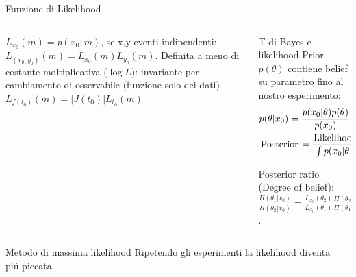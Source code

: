 \documentclass[asd-beamer.tex]{subfiles}
\begin{document}
\begin{frame}{Funzione di Likelihood}
\begin{columns}[T]
	\begin{column}{0.5\textwidth}
		$L_{x_0}(m)=p(x_0;m)$, se x,y eventi indipendenti: $L_{(x_0,y_0)}(m)=L_{x_0}(m)L_{y_0}(m)$. Definita a meno di costante moltiplicativa ($\log{L}$): invariante per cambiamento di osservabile (funzione solo dei dati)
		$L_{f(t_0)}(m)=|J(t_0)|L_{t_0}(m)$
	\end{column}
	\begin{column}{0.5\textwidth}
		\begin{block}{T di Bayes e likelihood}
			Prior $p(\theta)$ contiene belief su parametro fino al nostro esperimento:
			\begin{align*}
			&p(\theta|x_0)=\frac{p(x_0|\theta)p(\theta)}{p(x_0)}\\
			&\operatorname{Posterior}{}=\frac{\operatorname{Likelihood}{}\operatorname{Prior}{}}{\int p(x_0|\theta)p(\theta)\,d\theta}
			\end{align*}
			
			Posterior ratio (Degree of belief): $\frac{\Pi(\theta_1|x_0)}{\Pi(\theta_2|x_0)}=\frac{L_{x_0}(\theta_2)}{L_{x_0}(\theta_1)}\frac{\Pi(\theta_2)}{\Pi(\theta_1)}$.
		\end{block}
	\end{column}
\end{columns} 
\begin{columns}[T]
	\begin{column}{0.5\textwidth}
		\begin{block}{Metodo di massima likelihood}
			Ripetendo gli esperimenti la likelihood diventa pi\'u piccata.
		\end{block}
	\end{column}
	\begin{column}{0.5\textwidth}
		
	\end{column}
\end{columns}
\end{frame}
\end{document}
